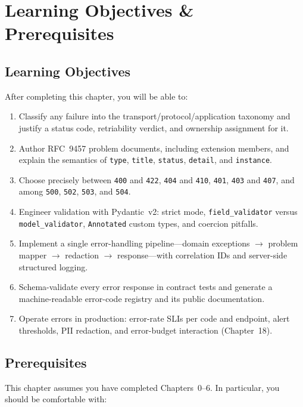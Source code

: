 \section{Learning Objectives \& Prerequisites}

\subsection*{Learning Objectives}

After completing this chapter, you will be able to:

\begin{enumerate}
  \item Classify any failure into the transport/protocol/application taxonomy
        and justify a status code, retriability verdict, and ownership
        assignment for it.
  \item Author RFC~9457 problem documents, including extension members, and
        explain the semantics of \texttt{type}, \texttt{title},
        \texttt{status}, \texttt{detail}, and \texttt{instance}.
  \item Choose precisely between \texttt{400} and \texttt{422}, \texttt{404}
        and \texttt{410}, \texttt{401}, \texttt{403} and \texttt{407}, and
        among \texttt{500}, \texttt{502}, \texttt{503}, and \texttt{504}.
  \item Engineer validation with Pydantic~v2: strict mode,
        \texttt{field\_validator} versus \texttt{model\_validator},
        \texttt{Annotated} custom types, and coercion pitfalls.
  \item Implement a single error-handling pipeline---domain exceptions
        $\rightarrow$ problem mapper $\rightarrow$ redaction $\rightarrow$
        response---with correlation IDs and server-side structured logging.
  \item Schema-validate every error response in contract tests and generate
        a machine-readable error-code registry and its public documentation.
  \item Operate errors in production: error-rate SLIs per code and endpoint,
        alert thresholds, PII redaction, and error-budget interaction
        (Chapter~18).
\end{enumerate}

\subsection*{Prerequisites}

This chapter assumes you have completed Chapters~0--6. In particular, you
should be comfortable with:

